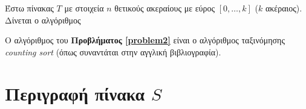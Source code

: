 \begin{problem}
	\label{problem2}
	Έστω πίνακας $T$ με στοιχεία $n$ θετικούς ακεραίους με εύρος $[0,\ldots,k]$ ($k$ ακέραιος). Δίνεται ο αλγόριθμος
	\begin{flushleft}
	\end{flushleft}
\end{problem}


Ο αλγόριθμος του \textbf{Προβλήματος \ref{problem2}} είναι ο αλγόριθμος ταξινόμησης \textsl{counting sort} (όπως συναντάται στην αγγλική βιβλιογραφία). 

\section{Περιγραφή πίνακα $S$}

